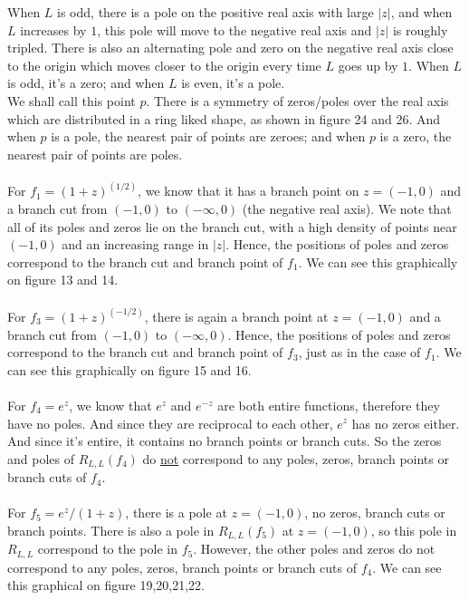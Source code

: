 \documentclass[10pt]{article}
\begin{document}
\noindent When $L$ is odd, there is a pole on the positive real axis with large $|z|$, and when $L$ increases by $1$, this pole will move to the negative real axis and $|z|$ is roughly tripled. There is also an alternating pole and zero on the negative real axis close to the origin which moves closer to the origin every time $L$ goes up by $1$. When $L$ is odd, it's a zero; and when $L$ is even, it's a pole.\\
We shall call this point $p$. There is a symmetry of zeros/poles over the real axis which are distributed in a ring liked shape, as shown in figure 24 and 26. And when $p$ is a pole, the nearest pair of points are zeroes; and when $p$ is a zero, the nearest pair of points are poles.\\\\
\noindent For \textbf{$f_1=(1+z)^{(1/2)}$}, we know that it has a branch point on $z=(-1,0)$ and a branch cut from $(-1,0)$ to $(-\infty,0)$ (the negative real axis). We note that all of its poles and zeros lie on the branch cut, with a high density of points near $(-1,0)$ and an increasing range in $|z|$. Hence, the positions of poles and zeros correspond to the branch cut and branch point of $f_1$. We can see this graphically on figure 13 and 14.\\\\
\noindent For \textbf{$f_3=(1+z)^{(-1/2)}$}, there is again a branch point at $z=(-1,0)$ and a branch cut from $(-1,0)$ to $(-\infty,0)$. Hence, the positions of poles and zeros correspond to the branch cut and branch point of $f_3$, just as in the case of $f_1$. We can see this graphically on figure 15 and 16.\\\\
\noindent For \textbf{$f_4=e^z$}, we know that $e^z$ and $e^{-z}$ are both entire functions, therefore they have no poles. And since they are reciprocal to each other, $e^z$ has no zeros either. And since it's entire, it contains no branch points or branch cuts. So the zeros and poles of $R_{L,L}(f_4)$ do \underline{not} correspond to any poles, zeros, branch points or branch cuts of $f_4$.\\\\
\noindent For \textbf{$f_5=e^z/(1+z)$}, there is a pole at $z=(-1,0)$, no zeros, branch cuts or branch points. There is also a pole in $R_{L,L}(f_5)$ at $z=(-1,0)$, so this pole in $R_{L,L}$ correspond to the pole in $f_5$. However, the other poles and zeros do not correspond to any poles, zeros, branch points or branch cuts of $f_4$. We can see this graphical on figure 19,20,21,22.\\\\
\end{document}
